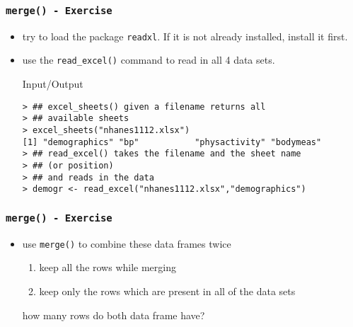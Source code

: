 \begin{frame}\frametitle{\texttt{merge() - Exercise}}
\begin{itemize}
\item try to load the package \texttt{readxl}. If it is not already installed, install it first.
\item use the \texttt{read\_excel()} command to read in all 4 data sets.\footnotesize
  \begin{exampleblock}{Input/Output}\small
\begin{verbatim}
> ## excel_sheets() given a filename returns all 
> ## available sheets 
> excel_sheets("nhanes1112.xlsx")
[1] "demographics" "bp"           "physactivity" "bodymeas"    
> ## read_excel() takes the filename and the sheet name 
> ## (or position)
> ## and reads in the data 
> demogr <- read_excel("nhanes1112.xlsx","demographics")
\end{verbatim}
  \end{exampleblock}
\end{itemize}
\end{frame}

\begin{frame}\frametitle{\texttt{merge() - Exercise}}
\begin{itemize}
\item use \texttt{merge()} to combine these data frames twice
  \begin{enumerate}
  \item keep all the rows while merging
  \item keep only the rows which are present in all of the data sets
  \end{enumerate}
  how many rows do both data frame have?
\end{itemize}
\end{frame}

